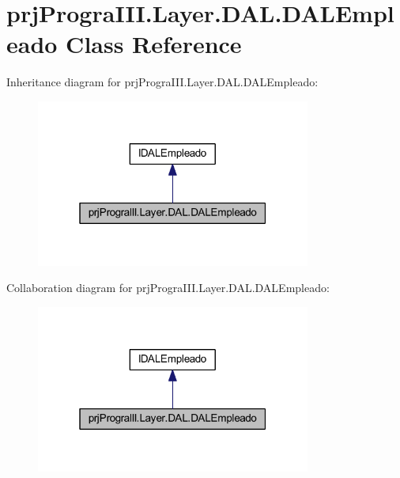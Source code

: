 \hypertarget{classprj_progra_i_i_i_1_1_layer_1_1_d_a_l_1_1_d_a_l_empleado}{}\section{prj\+Progra\+I\+I\+I.\+Layer.\+D\+A\+L.\+D\+A\+L\+Empleado Class Reference}
\label{classprj_progra_i_i_i_1_1_layer_1_1_d_a_l_1_1_d_a_l_empleado}


Inheritance diagram for prj\+Progra\+I\+I\+I.\+Layer.\+D\+A\+L.\+D\+A\+L\+Empleado\+:
\nopagebreak
\begin{figure}[H]
\begin{center}
\leavevmode
\includegraphics[width=256pt]{classprj_progra_i_i_i_1_1_layer_1_1_d_a_l_1_1_d_a_l_empleado__inherit__graph}
\end{center}
\end{figure}


Collaboration diagram for prj\+Progra\+I\+I\+I.\+Layer.\+D\+A\+L.\+D\+A\+L\+Empleado\+:
\nopagebreak
\begin{figure}[H]
\begin{center}
\leavevmode
\includegraphics[width=256pt]{classprj_progra_i_i_i_1_1_layer_1_1_d_a_l_1_1_d_a_l_empleado__coll__graph}
\end{center}
\end{figure}
